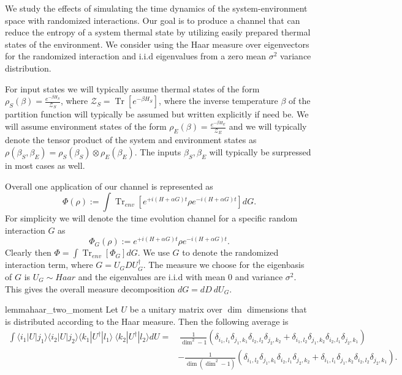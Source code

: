 \documentclass{article}
\newcommand{\ket}[1]{|#1\rangle}
\newcommand{\bra}[1]{\langle #1|}
\newcommand{\parens}[1]{\left( #1 \right)}
\newcommand{\brackets}[1]{\left[ #1 \right]}
\DeclareMathOperator{\Tr}{Tr}
\newcommand{\trace}[1]{\Tr \brackets{ #1 }}
\newcommand{\partrace}[2]{\Tr_{#1} \brackets{ #2 }}
\newcommand{\partfun}{\mathcal{Z}}
\begin{document}
We study the effects of simulating the time dynamics of the system-environment space with randomized interactions. Our goal is to produce a channel that can reduce the entropy of a system thermal state by utilizing easily prepared thermal states of the environment. We consider using the Haar measure over eigenvectors for the randomized interaction and i.i.d eigenvalues from a zero mean $\sigma^2$ variance distribution. 

For input states we will typically assume thermal states of the form $\rho_S(\beta) = \frac{e^{-\beta H_S}}{\partfun_S}$, where $\partfun_S = \trace{e^{-\beta H_S}}$, where the inverse temperature $\beta$ of the partition function will typically be assumed but written explicitly if need be. We will assume environment states of the form $\rho_E(\beta) = \frac{e^{-\beta H_E}}{\partfun_E}$ and we will typically denote the tensor product of the system and environment states as $\rho(\beta_S, \beta_E) = \rho_S(\beta_S) \otimes \rho_E(\beta_E)$. The inputs $\beta_S, \beta_E$ will typically be surpressed in most cases as well.


Overall one application of our channel is represented as
\begin{equation}
    \Phi(\rho) := \int \partrace{env}{e^{+i(H + \alpha G)t} \rho e^{-i(H + \alpha G) t}} dG.
\end{equation}
For simplicity we will denote the time evolution channel for a specific random interaction $G$ as
\begin{equation}
    \Phi_G(\rho) := e^{+i (H+ \alpha G) t} \rho e^{-i (H + \alpha G) t}. \label{eq:phi_g_definition}
\end{equation}
Clearly then $\Phi = \int \partrace{env}{\Phi_G} dG$. We use $G$ to denote the randomized interaction term, where $G = U_G D U_G^\dagger$. The measure we choose for the eigenbasis of $G$ is $U_G \sim Haar$ and the eigenvalues are i.i.d with mean 0 and variance $\sigma^2$. This gives the overall measure decomposition $dG = dD ~ dU_G$. 

\begin{restatable}{lemma}{haar_two_moment} \label{lem:haar_two_moment}
    Let $U$ be a unitary matrix over $\dim$ dimensions that is distributed according to the Haar measure. Then the following average is
    \begin{align}
        \int \bra{i_1} U \ket{j_1} \bra{i_2} U \ket{j_2} \bra{k_1} U^\dagger \ket{l_1} ~ \bra{k_2} U^\dagger \ket{l_2} dU =& ~\frac{1}{\dim^2 - 1} \parens{\delta_{i_1, l_1} \delta_{j_1, k_1} \delta_{i_2, l_2} \delta_{j_2, k_2} + \delta_{i_1, l_2} \delta_{j_1, k_2} \delta_{i_2, l_1} \delta_{j_2, k_1}} \nonumber \\
        &- \frac{1}{\dim(\dim^2 - 1)} \parens{\delta_{i_1, l_2} \delta_{j_1, k_1} \delta_{i_2, l_1} \delta_{j_2, k_2} + \delta_{i_1, l_1} \delta_{j_1, k_2} \delta_{i_2, l_2} \delta_{j_2, k_1}}. \label{eq:haar_two_moment_integral}
    \end{align}
    \end{restatable}
\end{document}
